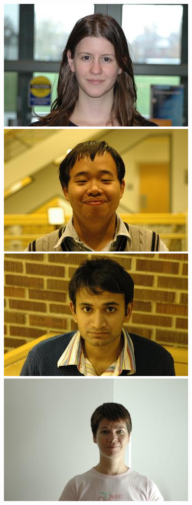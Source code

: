 \documentclass[12pt,journal,draftcls,letterpaper,onecolumn]{IEEEtran}
\begin{document}
\begin{figure}
\centering
\includegraphics[scale=0.75,clip=true]{figures_pami/uiuc_example/normal_indoor/DSC_1318.JPG}
\includegraphics[scale=0.75,clip=true]{figures_pami/uiuc_example/normal_indoor/DSC_1521.JPG}
\includegraphics[scale=0.75,clip=true]{figures_pami/uiuc_example/normal_indoor/DSC_1673.JPG}
\includegraphics[scale=0.75,clip=true]{figures_pami/uiuc_example/normal_indoor/DSC_1732.JPG}

\end{figure}
\end{document}
